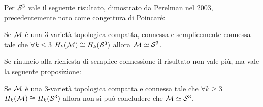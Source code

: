 \eproof
Per $ \mathcal{S}^{3} $ vale il seguente risultato, dimostrato da Perelman nel
2003, precedentemente noto come congettura di Poincaré:
\begin{proposition}
  Se $ \mathcal{M} $ è una $ 3 $-varietà topologica compatta, connessa e semplicemente
  connessa tale che $ \forall k \leq 3 $ $ H_k(\mathcal{M}) \cong H_k(\mathcal{S}^{3}) $ allora $ \mathcal{M} \simeq \mathcal{S}^{3} $.
\end{proposition}
Se rinuncio alla richiesta di semplice connessione il risultato non vale più, ma
vale la seguente proposizione:
\begin{proposition}
  Se $ \mathcal{M} $ è una $ 3 $-varietà topologica compatta e connessa tale che $ \forall k \geq 3 $
  $ H_k(\mathcal{M}) \cong H_k(\mathcal{S}^{3}) $ allora non si può concludere che $ \mathcal{M} \simeq \mathcal{S}^{3} $.
\end{proposition}

